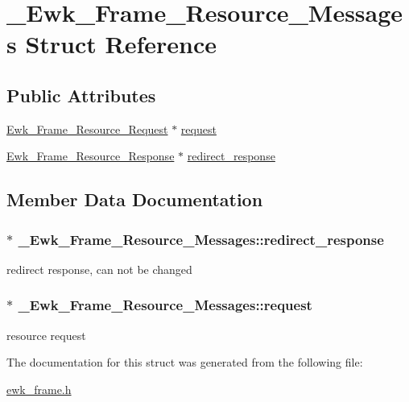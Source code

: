 \hypertarget{struct__Ewk__Frame__Resource__Messages}{\section{\+\_\+\+Ewk\+\_\+\+Frame\+\_\+\+Resource\+\_\+\+Messages Struct Reference}
\label{struct__Ewk__Frame__Resource__Messages}
}
\subsection*{Public Attributes}
\begin{DoxyCompactItemize}
\item 
\hyperlink{ewk__frame_8h_acddf624050dec184d7071e77847d1d94}{Ewk\+\_\+\+Frame\+\_\+\+Resource\+\_\+\+Request} $\ast$ \hyperlink{struct__Ewk__Frame__Resource__Messages_a6641143322f0b11db4e1e03524788d0d}{request}
\item 
\hyperlink{ewk__frame_8h_a738f355baff59c9821ee7d962a2d4492}{Ewk\+\_\+\+Frame\+\_\+\+Resource\+\_\+\+Response} $\ast$ \hyperlink{struct__Ewk__Frame__Resource__Messages_a893e409c8d941d75a465b95acd6dafc7}{redirect\+\_\+response}
\end{DoxyCompactItemize}


\subsection{Member Data Documentation}
\hypertarget{struct__Ewk__Frame__Resource__Messages_a893e409c8d941d75a465b95acd6dafc7}{
\subsubsection[{redirect\+\_\+response}]{$\ast$ \+\_\+\+Ewk\+\_\+\+Frame\+\_\+\+Resource\+\_\+\+Messages\+::redirect\+\_\+response}}\label{struct__Ewk__Frame__Resource__Messages_a893e409c8d941d75a465b95acd6dafc7}
redirect response, can not be changed \hypertarget{struct__Ewk__Frame__Resource__Messages_a6641143322f0b11db4e1e03524788d0d}{
\subsubsection[{request}]{$\ast$ \+\_\+\+Ewk\+\_\+\+Frame\+\_\+\+Resource\+\_\+\+Messages\+::request}}\label{struct__Ewk__Frame__Resource__Messages_a6641143322f0b11db4e1e03524788d0d}
resource request 

The documentation for this struct was generated from the following file\+:\begin{DoxyCompactItemize}
\item 
\hyperlink{ewk__frame_8h}{ewk\+\_\+frame.\+h}\end{DoxyCompactItemize}
